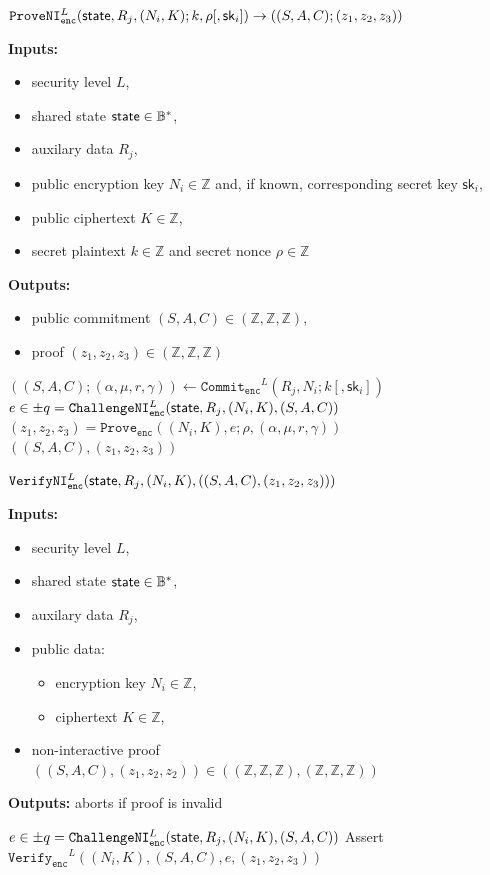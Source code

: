 \documentclass[11pt]{article}
\newenvironment{inlineAlgorithm}{}{}
\newcommand{\algoName}[1]{#1 \par}
\newcommand{\algoInputsList}[1]{
    {\small \bf Inputs:} 
        \begin{itemize}[noitemsep,topsep=0pt]
            #1
        \end{itemize}
}
\newcommand{\algoOutputs}[1]{
    {\small \bf Outputs:} #1 \par
}
\newcommand{\algoOutputsList}[1]{
    {\small \bf Outputs:}
        \begin{itemize}[noitemsep,topsep=0pt]
            #1
        \end{itemize}
}
\def\state{{\sf state}}
\newcommand{\commit}[1]{\ensuremath{\mathtt{Commit}_{\mathtt{#1}}}}
\newcommand{\challengeni}[1]{\ensuremath{\mathtt{ChallengeNI}_{\mathtt{#1}}}}
\newcommand{\prove}[1]{\ensuremath{\mathtt{Prove}_{\mathtt{#1}}}}
\newcommand{\proveni}[1]{\ensuremath{\mathtt{ProveNI}_{\mathtt{#1}}}}
\newcommand{\verify}[1]{\ensuremath{\mathtt{Verify}_{\mathtt{#1}}}}
\newcommand{\verifyni}[1]{\ensuremath{\mathtt{VerifyNI}_{\mathtt{#1}}}}
\newcommand{\sk}{\textsf{sk}}
\newcommand{\Z}{\mathbb{Z}}
\newcommand{\?}[1]{\stackrel{?}{#1}}
\newcommand{\Byte}{\ensuremath{\mathbb{B}}}
\begin{document}
\begin{description}

\item
\begin{inlineAlgorithm}
\algoName{$\proveni{enc}^L(\state, R_j, (N_i, K); k, \rho[, \sk_i]) \to ((S, A, C); (z_1, z_2, z_3))$}
\algoInputsList{
    \item security level $L$,
    \item shared state $\state \in \Byte^*$,
    \item auxilary data $R_j$,
    \item public encryption key $N_i \in \Z$ and, if known, corresponding secret key $\sk_i$,
    \item public ciphertext $K \in \Z$,
    \item secret plaintext $k \in \Z$ and secret nonce $\rho \in \Z$
}
\algoOutputsList{
    \item public commitment $(S, A, C) \in (\Z, \Z, \Z)$,
    \item proof $(z_1, z_2, z_3) \in (\Z, \Z, \Z)$
}
\begin{algorithmic}[1]
\State $((S, A, C); (\alpha, \mu, r, \gamma)) \gets \commit{enc}^L(R_j, N_i; k[, \sk_i])$
\State $e \in \pm q = \challengeni{enc}^L(\state, R_j, (N_i, K), (S, A, C))$
\State $(z_1, z_2, z_3) = \prove{enc}((N_i, K), e; \rho, (\alpha, \mu, r, \gamma))$
\State \Return $((S, A, C), (z_1, z_2, z_3))$
\end{algorithmic}
\end{inlineAlgorithm}

\item
\begin{inlineAlgorithm}
\algoName{$\verifyni{enc}^L(\state, R_j, (N_i, K), ((S, A, C), (z_1, z_2, z_3)))$}
\algoInputsList{
    \item security level $L$,
    \item shared state $\state \in \Byte^*$,
    \item auxilary data $R_j$,
    \item public data:
        \begin{itemize}
        \item encryption key $N_i \in \Z$,
        \item ciphertext $K \in \Z$,
        \end{itemize}
    \item non-interactive proof $((S, A, C), (z_1, z_2, z_2)) \in ((\Z, \Z, \Z), (\Z, \Z, \Z))$
}
\algoOutputs{aborts if proof is invalid}
\begin{algorithmic}[1]
\State $e \in \pm q = \challengeni{enc}^L(\state, R_j, (N_i, K), (S, A, C))$
\State Assert $\verify{enc}^L((N_i, K), (S, A, C), e, (z_1, z_2, z_3))$
\end{algorithmic}
\end{inlineAlgorithm}

\end{description}
\end{document}
